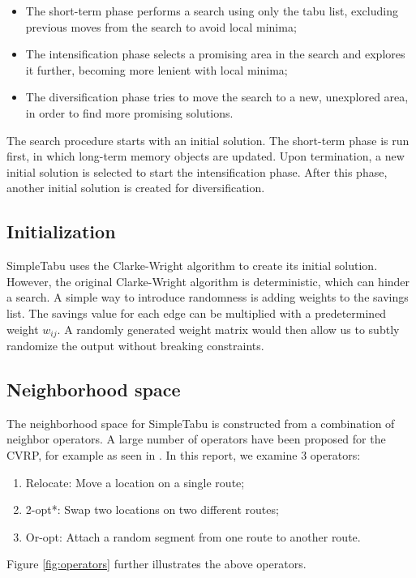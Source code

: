 \documentclass[12pt]{report}
\begin{document}
\begin{itemize}
	\item The short-term phase performs a search using only the tabu list, excluding previous moves from the search to avoid local minima;
	\item The intensification phase selects a promising area in the search and explores it further, becoming more lenient with local minima;
	\item The diversification phase tries to move the search to a new, unexplored area, in order to find more promising solutions.
\end{itemize}

The search procedure starts with an initial solution. The short-term phase is run first, in which long-term memory objects are updated. Upon termination, a new initial solution is selected to start the intensification phase. After this phase, another initial solution is created for diversification.

\subsection{Initialization}
SimpleTabu uses the Clarke-Wright algorithm to create its initial solution. However, the original Clarke-Wright algorithm is deterministic, which can hinder a search. A simple way to introduce randomness is adding weights to the savings list. The savings value for each edge can be multiplied with a predetermined weight $w_{ij}$. A randomly generated weight matrix would then allow us to subtly randomize the output without breaking constraints.

\subsection{Neighborhood space}
The neighborhood space for SimpleTabu is constructed from a combination of neighbor operators. A large number of operators have been proposed for the CVRP, for example as seen in \cite{mcnabb2015testing}. In this report, we examine 3 operators:
\begin{enumerate}
	\item Relocate: Move a location on a single route;
	\item 2-opt*: Swap two locations on two different routes;
	\item Or-opt: Attach a random segment from one route to another route.
\end{enumerate}

Figure \ref{fig:operators} further illustrates the above operators.
\end{document}
